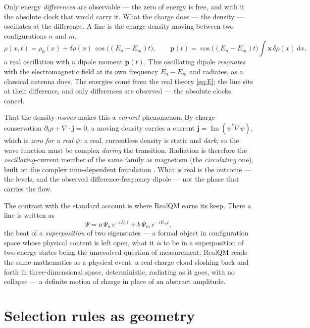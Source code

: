 \documentclass[11pt]{article}
\begin{document}
Only energy \emph{differences} are observable --- the zero of energy is free, and with it the absolute clock
that would carry it. What the charge does --- the density --- oscillates at the difference. A line is the
charge density moving between two configurations $n$ and $m$,
\begin{equation}
\rho(x,t)=\rho_0(x)+\delta\rho(x)\,\cos\!\big((E_n-E_m)t\big),
\qquad
\mathbf p(t)=\cos\!\big((E_n-E_m)t\big)\int \mathbf x\,\delta\rho(x)\,dx ,
\label{eq:osc}
\end{equation}
a real oscillation with a dipole moment $\mathbf p(t)$. This oscillating dipole \emph{resonates} with the
electromagnetic field at its own frequency $E_n-E_m$ and radiates, as a classical antenna does. The energies
come from the real theory \eqref{eq:E}; the line sits at their difference, and only differences are observed
--- the absolute clocks cancel.

That the density \emph{moves} makes this a \emph{current} phenomenon. By charge conservation
$\partial_t\rho+\nabla\!\cdot\mathbf j=0$, a moving density carries a current
$\mathbf j=\operatorname{Im}(\psi^*\nabla\psi)$, which is \emph{zero for a real} $\psi$: a real, currentless
density is static and \emph{dark}, so the wave function must be complex \emph{during} the transition.
Radiation is therefore the \emph{oscillating}-current member of the same family as magnetism (the
\emph{circulating} one), built on the complex time-dependent foundation \cite{ComplexRealQM}. What is real is
the outcome --- the levels, and the observed difference-frequency dipole --- not the phase that carries the
flow.

The contrast with the standard account is where RealQM earns its keep. There a line is written as
\begin{equation}
\Psi=a\,\Psi_n\,e^{-iE_nt}+b\,\Psi_m\,e^{-iE_mt},
\label{eq:super}
\end{equation}
the beat of a \emph{superposition} of two eigenstates --- a formal object in configuration space whose
physical content is left open, what it \emph{is} to be in a superposition of two energy states being the
unresolved question of measurement. RealQM reads the same mathematics as a physical event: a real charge
cloud sloshing back and forth in three-dimensional space, deterministic, radiating as it goes, with no
collapse --- a definite motion of charge in place of an abstract amplitude.

\section{Selection rules as geometry}
\label{sec:selection}
\end{document}
